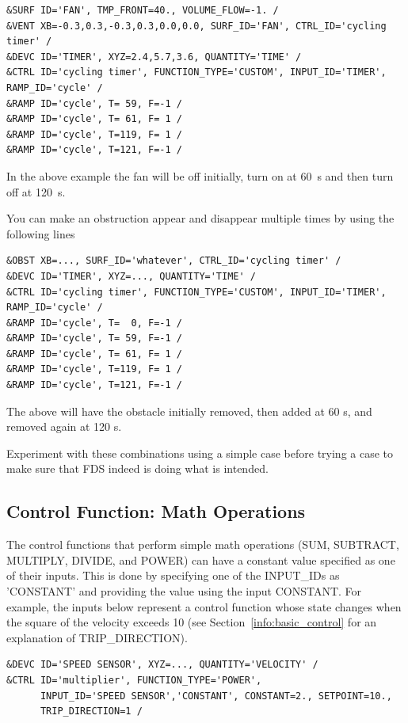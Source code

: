 \documentclass[11pt]{book}
\begin{document}
\begin{lstlisting}
&SURF ID='FAN', TMP_FRONT=40., VOLUME_FLOW=-1. /
&VENT XB=-0.3,0.3,-0.3,0.3,0.0,0.0, SURF_ID='FAN', CTRL_ID='cycling timer' /
&DEVC ID='TIMER', XYZ=2.4,5.7,3.6, QUANTITY='TIME' /
&CTRL ID='cycling timer', FUNCTION_TYPE='CUSTOM', INPUT_ID='TIMER', RAMP_ID='cycle' /
&RAMP ID='cycle', T= 59, F=-1 /
&RAMP ID='cycle', T= 61, F= 1 /
&RAMP ID='cycle', T=119, F= 1 /
&RAMP ID='cycle', T=121, F=-1 /
\end{lstlisting}

\noindent
In the above example the fan will be off initially, turn on at 60~s and then turn off at 120~s.

You can make an obstruction appear and disappear multiple times by using the following lines

\begin{lstlisting}
&OBST XB=..., SURF_ID='whatever', CTRL_ID='cycling timer' /
&DEVC ID='TIMER', XYZ=..., QUANTITY='TIME' /
&CTRL ID='cycling timer', FUNCTION_TYPE='CUSTOM', INPUT_ID='TIMER', RAMP_ID='cycle' /
&RAMP ID='cycle', T=  0, F=-1 /
&RAMP ID='cycle', T= 59, F=-1 /
&RAMP ID='cycle', T= 61, F= 1 /
&RAMP ID='cycle', T=119, F= 1 /
&RAMP ID='cycle', T=121, F=-1 /
\end{lstlisting}

\noindent
The above will have the obstacle initially removed, then added at 60 s, and removed again at 120 s.

Experiment with these combinations using a simple
case before trying a case to make sure that FDS indeed is doing what is intended.

\subsection{Control Function: Math Operations }
\label{info:CONTROL_MATH}

The control functions that perform simple math operations ({\ct SUM},  {\ct SUBTRACT},  {\ct MULTIPLY},  {\ct DIVIDE}, and  {\ct POWER}) can have a constant value specified as one of their inputs.  This is done by specifying one of the {\ct INPUT\_ID}s as {\ct 'CONSTANT'} and providing the value using the input {\ct CONSTANT}. For example, the inputs below represent a control function whose state changes when the square of the velocity exceeds 10 (see Section~\ref{info:basic_control} for an explanation of {\ct TRIP\_DIRECTION}).

\begin{lstlisting}
&DEVC ID='SPEED SENSOR', XYZ=..., QUANTITY='VELOCITY' /
&CTRL ID='multiplier', FUNCTION_TYPE='POWER',
      INPUT_ID='SPEED SENSOR','CONSTANT', CONSTANT=2., SETPOINT=10.,
      TRIP_DIRECTION=1 /
\end{lstlisting}
\end{document}

